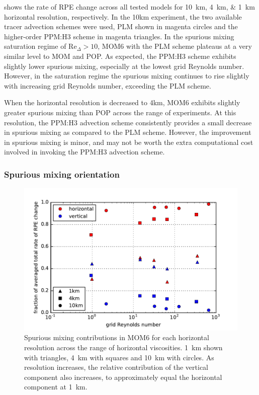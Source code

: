  shows the rate of RPE change across all tested models for \SIlist{10;4;1}{\kilo\metre} horizontal resolution, respectively. In the 10km experiment, the two available tracer advection schemes were used, PLM shown in magenta circles and the higher-order PPM:H3 scheme in magenta triangles. In the spurious mixing saturation regime of $\mathrm{Re}_\Delta > 10$, MOM6 with the PLM scheme plateaus at a very similar level to MOM and POP. As expected, the PPM:H3 scheme exhibits slightly lower spurious mixing, especially at the lowest grid Reynolds number. However, in the saturation regime the spurious mixing continues to rise slightly with increasing grid Reynolds number, exceeding the PLM scheme.

When the horizontal resolution is decreased to 4km, MOM6 exhibits slightly greater spurious mixing than POP across the range of experiments. At this resolution, the PPM:H3 advection scheme consistently provides a small decrease in spurious mixing as compared to the PLM scheme. However, the improvement in spurious mixing is minor, and may not be worth the extra computational cost involved in invoking the PPM:H3 advection scheme.

\subsubsection{Spurious mixing orientation}

\begin{figure}
  \includegraphics{../plots/eddies_drpe_split.pdf}
  \caption{\label{fig:eddies-drpesplit} Spurious mixing contributions in MOM6 for each horizontal resolution across the range of horizontal viscosities. \SI{1}{\kilo\metre} shown with triangles, \SI{4}{\kilo\metre} with squares and \SI{10}{\kilo\metre} with circles. As resolution increases, the relative contribution of the vertical component also increases, to approximately equal the horizontal component at \SI{1}{\kilo\metre}.}
\end{figure}

